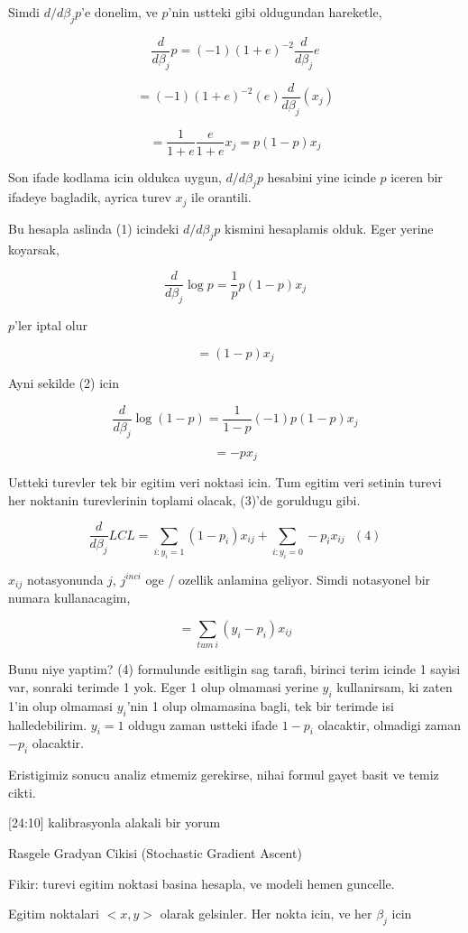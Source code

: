 \documentclass[12pt,fleqn]{article}\usepackage{../common}
\begin{document}
Simdi  $d/d\beta_j p$'e donelim, ve $p$'nin ustteki gibi oldugundan
hareketle,

$$ \frac{ d}{d\beta_j}p = (-1)(1+e)^{-2} \frac{ d}{d\beta_j}e $$


$$ = (-1)(1+e)^{-2} (e) \frac{ d}{d\beta_j}(x_j) $$

$$ = \frac{ 1}{1+e} \frac{ e}{1+e}x_j = p(1-p)x_j$$


Son ifade kodlama icin oldukca uygun, $d/d\beta_j p$ hesabini yine icinde
$p$ iceren bir ifadeye bagladik, ayrica turev $x_j$ ile orantili. 

Bu hesapla aslinda (1) icindeki $d/d\beta_j p$ kismini hesaplamis
olduk. Eger yerine koyarsak, 

$$ 
\frac{d}{d\beta_j}\log p = \frac{1}{p}p(1-p)x_j 
$$

$p$'ler iptal olur

$$ 
= (1-p)x_j 
$$

Ayni sekilde (2) icin 

$$ 
\frac{d}{d\beta_j}\log (1-p) = \frac{1}{1-p}(-1) p(1-p)x_j 
$$

$$ 
 =  -px_j 
$$


Ustteki turevler tek bir egitim veri noktasi icin. Tum egitim veri setinin
turevi her noktanin turevlerinin toplami olacak, (3)'de goruldugu gibi.

$$ \frac{d}{d\beta_j} LCL = 
\sum _{i: y_i = 1} (1-p_i)x_{ij} + 
\sum _{i: y_i = 0} -p_i x_{ij}  
\ \ \ (4)
$$

$x_{ij}$ notasyonunda $j$, $j^{inci}$ oge / ozellik anlamina geliyor. Simdi notasyonel bir numara kullanacagim, 

$$ = \sum _{tum \ i} (y_i - p_i)x_{ij} $$

Bunu niye yaptim? (4) formulunde esitligin sag tarafi, birinci terim icinde
1 sayisi var, sonraki terimde 1 yok. Eger 1 olup olmamasi yerine $y_i$
kullanirsam, ki zaten 1'in olup olmamasi $y_i$'nin 1 olup olmamasina bagli,
tek bir terimde isi halledebilirim. $y_i=1$ oldugu zaman ustteki ifade
$1-p_i$ olacaktir, olmadigi zaman $-p_i$ olacaktir. 

Eristigimiz sonucu analiz etmemiz gerekirse, nihai formul gayet basit ve
temiz cikti. 

[24:10] kalibrasyonla alakali bir yorum

Rasgele Gradyan Cikisi (Stochastic Gradient Ascent)

Fikir: turevi egitim noktasi basina hesapla, ve modeli hemen guncelle. 

Egitim noktalari $<x,y>$ olarak gelsinler. Her nokta icin, ve her $\beta_j$
icin
\end{document}

